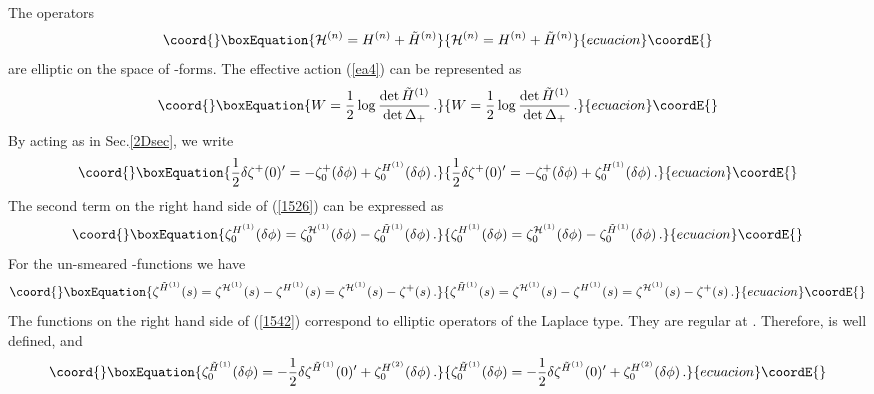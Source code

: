 \documentclass[a4paper,12pt]{article}
\begin{document}
The operators
\begin{equation}\coord{}\boxEquation{
{\cal H}^{(n)}=H^{(n)}+\tilde H^{(n)} \label{calH}
}{
{\cal H}^{(n)}=H^{(n)}+\tilde H^{(n)} }{ecuacion}\coordE{}\end{equation}
are elliptic on the space of \coordHE{}-forms.
The effective action (\ref{ea4}) can be represented as
\begin{equation}\coord{}\boxEquation{
W=\frac 12 \log \frac {\det \tilde H^{(1)}}{\det \Delta_+} \,.
\label{eff4D}
}{
W=\frac 12 \log \frac {\det \tilde H^{(1)}}{\det \Delta_+} \,.
}{ecuacion}\coordE{}\end{equation}
By acting as in Sec.\ref{2Dsec}, we write
\begin{equation}\coord{}\boxEquation{
\frac 12 \delta \zeta^+(0)'=-\zeta_0^+ (\delta\phi )
+\zeta_0^{H^{(1)}} (\delta\phi ) \,. \label{1526}
}{
\frac 12 \delta \zeta^+(0)'=-\zeta_0^+ (\delta\phi )
+\zeta_0^{H^{(1)}} (\delta\phi ) \,. }{ecuacion}\coordE{}\end{equation}
The second term on the right hand side of (\ref{1526})
can be expressed as
\begin{equation}\coord{}\boxEquation{
\zeta_0^{H^{(1)}} (\delta\phi )=
\zeta_0^{{\cal H}^{(1)}} (\delta\phi )-
\zeta_0^{\tilde H^{(1)}} (\delta\phi ) \,. \label{1534}
}{
\zeta_0^{H^{(1)}} (\delta\phi )=
\zeta_0^{{\cal H}^{(1)}} (\delta\phi )-
\zeta_0^{\tilde H^{(1)}} (\delta\phi ) \,. }{ecuacion}\coordE{}\end{equation}
For the un-smeared \myHighlight{$\zeta$}\coordHE{}-functions we have
\begin{equation}\coord{}\boxEquation{
\zeta^{\tilde H^{(1)}}(s)=\zeta^{{\cal H}^{(1)}} (s)
-\zeta^{H^{(1)}}(s)=
\zeta^{{\cal H}^{(1)}} (s)-\zeta^+ (s) \,.
\label{1542}
}{
\zeta^{\tilde H^{(1)}}(s)=\zeta^{{\cal H}^{(1)}} (s)
-\zeta^{H^{(1)}}(s)=
\zeta^{{\cal H}^{(1)}} (s)-\zeta^+ (s) \,.
}{ecuacion}\coordE{}\end{equation}
The \myHighlight{$\zeta$}\coordHE{} functions on the right hand side of (\ref{1542})
correspond to elliptic operators of the Laplace type.
They are regular at \coordHE{}. Therefore, 
\coordHE{} is well defined, and
\begin{equation}\coord{}\boxEquation{
\zeta_0^{\tilde H^{(1)}} (\delta\phi )=
-\frac 12 \delta \zeta^{\tilde H^{(1)}}(0)' +
\zeta_0^{H^{(2)}} (\delta\phi ) \,.         \label{1554}
}{
\zeta_0^{\tilde H^{(1)}} (\delta\phi )=
-\frac 12 \delta \zeta^{\tilde H^{(1)}}(0)' +
\zeta_0^{H^{(2)}} (\delta\phi ) \,.         }{ecuacion}\coordE{}\end{equation}
\end{document}
